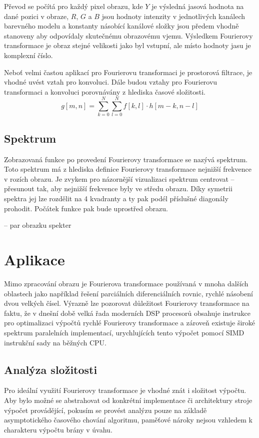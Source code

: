 \documentclass[11pt,a4paper]{article}
\begin{document}
Převod se počítá pro každý pixel obrazu, kde $Y$ je výsledná jasová hodnota na dané pozici v obraze,
$R$, $G$ a $B$ jsou hodnoty intenzity v jednotlivých kanálech barevného modelu a konstanty násobící
kanálové složky jsou předem vhodně stanoveny aby odpovídaly skutečnému obrazovému vjemu.
Výsledkem Fourierovy transformace je obraz stejné velikosti jako byl vstupní, ale místo hodnoty jasu
je komplexní číslo.

Neboť velmi častou aplikací pro Fourierovu transformaci je prostorová filtrace, je vhodné uvést vztah 
pro konvoluci. Dále budou vztahy pro Fourierovu transformaci a konvoluci porovnávány z hlediska 
časové složitosti.
\begin{equation}
g[m,n] = \sum_{k=0}^{N}{\sum_{l=0}^{N}{f[k,l]\cdot h[m-k, n-l]}}
\label{konvoluce}
\end{equation}

\subsection{Spektrum}
Zobrazovaná funkce po provedení Fourierovy transformace se nazývá spektrum.  Toto spektrum má z hlediska 
definice Fourierovy transformace nejnižší frekvence v rozích obrazu. Je zvykem
pro názornější vizualizaci spektrum centrovat -- přesunout tak, aby nejnižší frekvence byly ve středu obrazu.
Díky symetrii spektra jej lze rozdělit na 4 kvadranty a ty pak podél příslušné diagonály prohodit. Počátek
funkce pak bude uprostřed obrazu.


-- par obrazku spekter

\section{Aplikace}
Mimo zpracování obrazu je Fourierova transformace používaná v mnoha dalších oblastech jako například
řešení parciálních diferenciálních rovnic, rychlé násobení dvou velkých čísel. Výrazně lze pozorovat
důležitost Fourierovy transformace na faktu, že v dnešní době velká řada moderních DSP procesorů obsahuje
instrukce pro optimalizaci výpočtů rychlé Fourierovy transformace a zároveň existuje široké spektrum
paralelních implementací, urychlujících tento výpočet pomocí SIMD instrukční sady na běžných CPU.

\subsection{Analýza složitosti}
Pro ideální využití Fourierovy transformace je vhodné znát i složitost výpočtu. Aby bylo  možné se
abstrahovat od konkrétní implementace či architektury stroje výpočet provádějící, 
pokusím se provést analýzu pouze na základě asymptotického časového chování algoritmu, paměťové
nároky nejsou vzhledem k charakteru výpočtu brány v úvahu.
\end{document}
